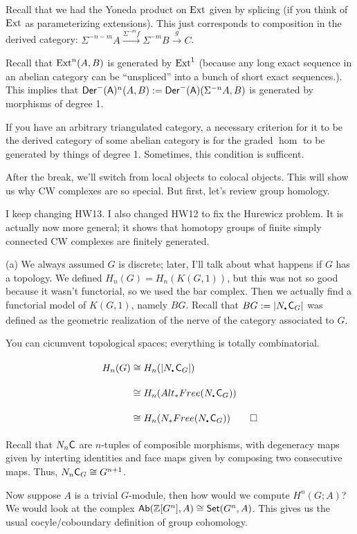 \begin{remark}
 Recall that we had the Yoneda product on $\operatorname{Ext}$ given by splicing (if you think of $\operatorname{Ext}$ as parameterizing extensions). This just corresponds to composition in the derived category: $\Sigma^{-n-m}A\xrightarrow{\Sigma^{-m} f} \Sigma^{-m}B\xrightarrow{g} C$.
 
 Recall that $\operatorname{Ext}^n(A,B)$ is generated by $\operatorname{Ext}^1$ (because any long exact sequence in an abelian category can be ``unspliced'' into a bunch of short exact sequences.). This implies that $\operatorname{\sf Der}^-(\text{\sf A})^n(A,B):=\operatorname{\sf Der}^-(\text{\sf A})(\Sigma^{-n}A,B)$ is generated by morphisms of degree 1.
 
 If you have an arbitrary triangulated category, a necessary criterion for it to be the derived category of some abelian category is for the graded $\hom$ to be generated by things of degree 1. Sometimes, this condition is sufficent.
\end{remark}
After the break, we'll switch from local objects to colocal objects. This will show us why CW complexes are so special. But first, let's review group homology.

I keep changing HW13. I also changed HW12 to fix the Hurewicz problem. It is actually now more general; it shows that homotopy groups of finite simply connected CW complexes are finitely generated.

(a) We always assumed $G$ is discrete; later, I'll talk about what happens if $G$ has a topology. We defined $H_n(G)=H_n(K(G,1))$, but this was not so good because it wasn't functorial, so we used the bar complex. Then we actually find a functorial model of $K(G,1)$, namely $BG$. Recall that $BG:=|N_\udot \C_G|$ was defined as the geometric realization of the nerve of the category associated to $G$.
\begin{remark}
 You can cicumvent topological spaces; everything is totally combinatorial.
 \begin{align*}
  H_n(G)&\cong H_n(|N_\udot \C_G|)\\
  &\cong H_n(Alt_* Free(N_\udot \C_G))\\
  &\cong H_n(N_* Free(N_\udot \C_G))\qedhere
 \end{align*}
\end{remark}
Recall that $N_n \text{\sf C}$ are $n$-tuples of composible morphisms, with degeneracy maps given by interting identities and face maps given by composing two consecutive maps. Thus, $N_n \text{\sf C}_G\cong G^{n+1}$.

Now suppose $A$ is a trivial $G$-module, then how would we compute $H^n(G;A)$? We would look at the complex $\text{\sf Ab}(\mathbb{Z}[G^n],A)\cong \operatorname{\sf Set}(G^n,A)$. This gives us the usual cocyle/coboundary definition of group cohomology.

